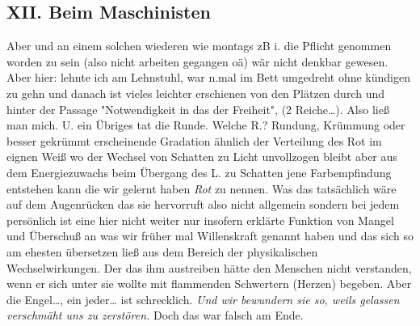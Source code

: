 \documentclass[
]{article}
\author{}
\date{\vspace{-2.5em}}
\begin{document}
\subsection{XII. Beim Maschinisten}\label{xii.-beim-maschinisten}

Aber und an einem solchen wiederen wie montags zB i. die Pflicht
genommen worden zu sein (also nicht arbeiten gegangen oä) wär nicht
denkbar gewesen. Aber hier: lehnte ich am Lehnstuhl, war n.mal im Bett
umgedreht ohne kündigen zu gehn und danach ist vieles leichter
erschienen von den Plätzen durch und hinter der Passage "Notwendigkeit
in das der Freiheit", (2 Reiche\ldots). Also ließ man mich. U. ein
Übriges tat die Runde. Welche R.? Rundung, Krümmung oder besser gekrümmt
erscheinende Gradation ähnlich der Verteilung des Rot im eignen Weiß wo
der Wechsel von Schatten zu Licht unvollzogen bleibt aber aus dem
Energiezuwachs beim Übergang des L. zu Schatten jene Farbempfindung
entstehen kann die wir gelernt haben \emph{Rot} zu nennen. Was das
tatsächlich wäre auf dem Augenrücken das sie hervorruft also nicht
allgemein sondern bei jedem persönlich ist eine hier nicht weiter nur
insofern erklärte Funktion von Mangel und Überschuß an was wir früher
mal Willenskraft genannt haben und das sich so am ehesten übersetzen
ließ aus dem Bereich der physikalischen Wechselwirkungen. Der das ihm
austreiben hätte den Menschen nicht verstanden, wenn er sich unter sie
wollte mit flammenden Schwertern (Herzen) begeben. Aber die Engel\ldots,
ein jeder\ldots{} ist schrecklich. \emph{Und wir bewundern sie so, weils
gelassen verschmäht uns zu zerstören. }Doch das war falsch am Ende.
\end{document}
